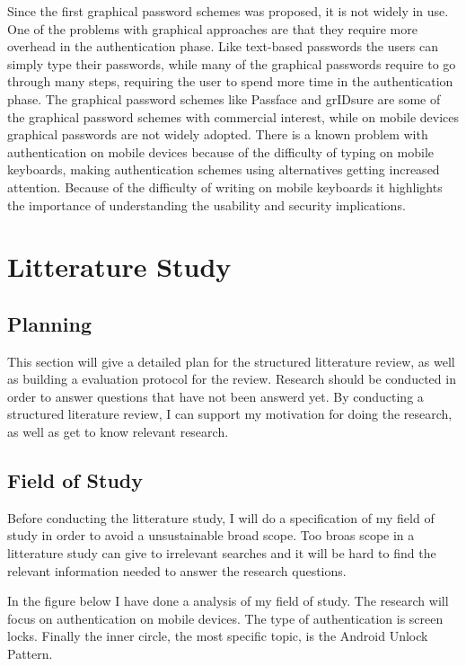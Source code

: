   Since the first graphical password schemes was proposed, it is not widely in use. One of the problems with graphical approaches are that they require more overhead in the authentication phase. Like text-based passwords the users can simply type their passwords, while many of the graphical passwords require to go through many steps, requiring the user to spend more time in the authentication phase. The graphical password schemes like Passface and grIDsure are some of the graphical password schemes with commercial interest, while on mobile devices graphical passwords are not widely adopted. There is a known problem with authentication on mobile devices because of the difficulty of typing on mobile keyboards, making authentication schemes using alternatives getting increased attention. Because of the difficulty of writing on mobile keyboards it highlights the importance of understanding the usability and security implications.


\chapter{Litterature Study}
  \section{Planning}
    This section will give a detailed plan for the structured litterature review, as well as building a 
    evaluation protocol for the review. 
    Research should be conducted in order to answer questions that have not been answerd yet. 
    By conducting a structured literature review, I can support my motivation for doing the research, 
    as well as get to know relevant research. 

    \section{Field of Study}
    Before conducting the litterature study, I will do a specification of my field of study in order to
    avoid a unsustainable broad scope. Too broas scope in a litterature study can give to irrelevant searches 
    and it will be hard to find the relevant information needed to answer the research questions. 

    In the figure below I have done a analysis of my field of study. The research will focus on authentication on mobile devices. 
    The type of authentication is screen locks. Finally the inner circle, the most specific topic, is the Android Unlock Pattern. 

